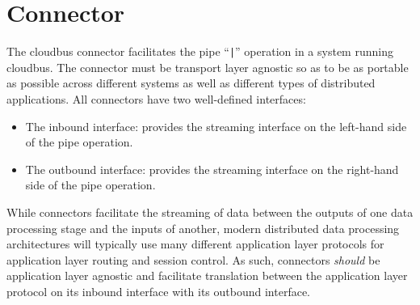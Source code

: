 \section{\AppName Connector}
The cloudbus connector facilitates the pipe ``\texttt{|}'' operation in a system running cloudbus. The connector must be transport layer %
agnostic so as to be as portable as possible across different systems as well as different types of distributed applications. %
All connectors have two well-defined interfaces:
\begin{itemize}
	\item The inbound interface: provides the streaming interface on the left-hand side of the pipe operation.
	\item The outbound interface: provides the streaming interface on the right-hand side of the pipe operation.
\end{itemize}
While connectors facilitate the streaming of data between the outputs of one data processing stage and the inputs of another, %
modern distributed data processing architectures will typically use many different application layer protocols for application %
layer routing and session control. As such, connectors \emph{should} be application layer agnostic and facilitate %
translation between the application layer protocol on its inbound interface with its outbound interface.